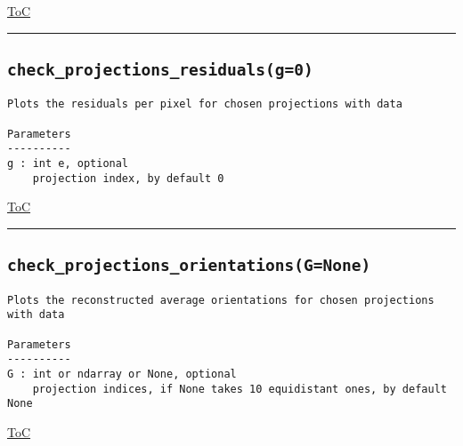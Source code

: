 \documentclass{article}
\begin{document}
\begin{flushright}

\hyperref[toc]{ToC}

\end{flushright}



\vspace{5mm}

\hrule

\subsection*{\texttt{check\_projections\_residuals(g=0)}}
\label{fun:checkprojectionsresiduals}

\begin{lstlisting}[language=docstring]
Plots the residuals per pixel for chosen projections with data

Parameters
----------
g : int e, optional
    projection index, by default 0
\end{lstlisting}

\begin{flushright}

\hyperref[toc]{ToC}

\end{flushright}



\vspace{5mm}

\hrule

\subsection*{\texttt{check\_projections\_orientations(G=None)}}
\label{fun:checkprojectionsorientations}

\begin{lstlisting}[language=docstring]
Plots the reconstructed average orientations for chosen projections with data

Parameters
----------
G : int or ndarray or None, optional
    projection indices, if None takes 10 equidistant ones, by default None
\end{lstlisting}

\begin{flushright}

\hyperref[toc]{ToC}

\end{flushright}
\end{document}
